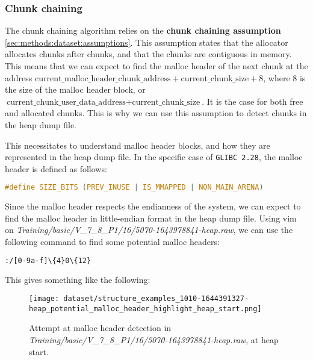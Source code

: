     \subsubsection{Chunk chaining}
    The chunk chaining algorithm relies on the \textbf{chunk chaining assumption} \ref{sec:methods:dataset:assumptions}. This assumption states that the allocator allocates chunks after chunks, and that the chunks are contiguous in memory. This means that we can expect to find the malloc header of the next chunk at the address $ \text{current\_malloc\_header\_chunk\_address} + \text{current\_chunk\_size} + 8 $, where 8 is the size of the malloc header block, or $ \text{current\_chunk\_user\_data\_address} + \text{current\_chunk\_size} $. It is the case for both free and allocated chunks. This is why we can use this assumption to detect chunks in the heap dump file. 
    
    This necessitates to understand malloc header blocks, and how they are represented in the heap dump file. In the specific case of \texttt{GLIBC 2.28}, the malloc header is defined as follows:

    \begin{minipage}{\dimexpr\linewidth-20pt}
        \begin{lstlisting}[language=c, caption={Malloc header definition in \texttt{GLIBC 2.28}}]
            #define SIZE_BITS (PREV_INUSE | IS_MMAPPED | NON_MAIN_ARENA)
        \end{lstlisting}
    \end{minipage}
    
    Since the malloc header respects the endianness of the system, we can expect to find the malloc header in little-endian format in the heap dump file. Using vim on \textit{Training/basic/V\_7\_8\_P1/16/5070-1643978841-heap.raw}, we can use the following command to find some potential malloc headers:

    \begin{lstlisting}[language=bash, caption={Vim command to find potential malloc headers}]
        :/[0-9a-f]\{4}0\{12}
    \end{lstlisting}
    
    This gives something like the following:

    \begin{figure}[H]
        \centering
        \texttt{[image: dataset/structure\_examples\_1010-1644391327-heap\_potential\_malloc\_header\_highlight\_heap\_start.png]}
        \caption{Attempt at malloc header detection in \textit{Training/basic/V\_7\_8\_P1/16/5070-1643978841-heap.raw}, at heap start.}
    \end{figure}

